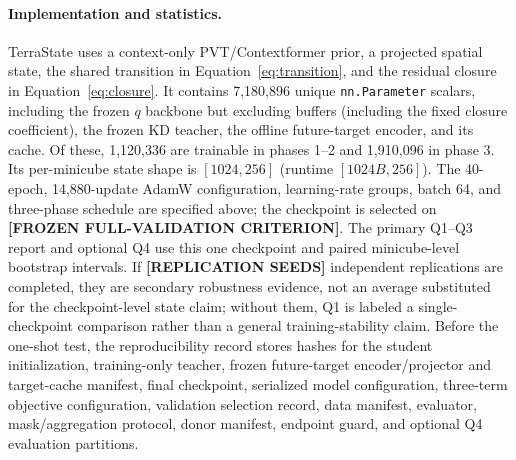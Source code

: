 \documentclass[letterpaper]{article} %
\begin{document}
\paragraph{Implementation and statistics.}
TerraState uses a context-only PVT/Contextformer prior, a projected
spatial state, the shared transition in Equation~\ref{eq:transition}, and the
residual closure in Equation~\ref{eq:closure}. It contains 7,180,896 unique
\texttt{nn.Parameter} scalars, including the frozen $q$ backbone but excluding
buffers (including the fixed closure coefficient), the frozen KD teacher, the
offline future-target encoder, and its cache. Of these, 1,120,336 are trainable
in phases 1--2 and 1,910,096 in phase 3. Its per-minicube state shape is
$[1024,256]$ (runtime $[1024B,256]$). The 40-epoch, 14,880-update AdamW
configuration, learning-rate groups, batch 64, and three-phase schedule are
specified above; the checkpoint is selected on \textbf{[FROZEN FULL-VALIDATION
CRITERION]}. The primary Q1--Q3 report and optional Q4 use this one checkpoint
and paired minicube-level bootstrap intervals. If
\textbf{[REPLICATION SEEDS]} independent replications are completed, they are
secondary robustness evidence, not an average substituted for the
checkpoint-level state claim; without them, Q1 is labeled a single-checkpoint
comparison rather than a general training-stability claim. Before the one-shot
test, the reproducibility record stores hashes for the student initialization,
training-only teacher, frozen future-target encoder/projector and target-cache
manifest, final checkpoint, serialized model configuration, three-term
objective configuration, validation selection record, data manifest,
evaluator, mask/aggregation protocol, donor manifest, endpoint guard, and
optional Q4 evaluation partitions.
\end{document}
